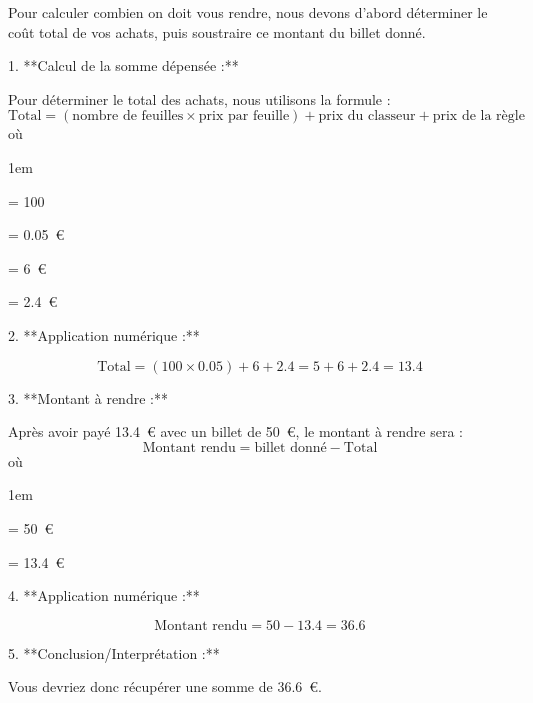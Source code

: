 \documentclass[answers]{exam}
\begin{document}
\begin{solution}
Pour calculer combien on doit vous rendre, nous devons d'abord déterminer le coût total de vos achats, puis soustraire ce montant du billet donné.

1. **Calcul de la somme dépensée :**

   Pour déterminer le total des achats, nous utilisons la formule :
   \[
   \text{Total} = (\text{nombre de feuilles} \times \text{prix par feuille}) + \text{prix du classeur} + \text{prix de la règle}
   \]
   où
   \begin{addmargin}[4em]{1em}
     \begin{compactitem}
         \item {} = 100
         \item {} = \SI{0.05}{\euro}
         \item {} = \SI{6}{\euro}
         \item {} = \SI{2.4}{\euro}
     \end{compactitem}
   \end{addmargin}

2. **Application numérique :**
   
   \[
   \text{Total} = (100 \times 0.05) + 6 + 2.4 = 5 + 6 + 2.4 = 13.4
   \]

3. **Montant à rendre :**

   Après avoir payé \SI{13.4}{\euro} avec un billet de \SI{50}{\euro}, le montant à rendre sera :
   \[
   \text{Montant rendu} = \text{billet donné} - \text{Total}
   \]
   où
   \begin{addmargin}[4em]{1em}
     \begin{compactitem}
         \item {} = \SI{50}{\euro}
         \item {} = \SI{13.4}{\euro}
     \end{compactitem}
   \end{addmargin}
   
4. **Application numérique :**
   
   \[
   \text{Montant rendu} = 50 - 13.4 = 36.6
   \]

5. **Conclusion/Interprétation :**

   Vous devriez donc récupérer une somme de \SI{36.6}{\euro}.
\end{solution}
\end{document}
